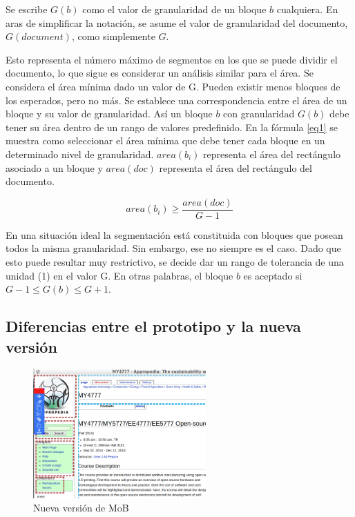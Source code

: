 \documentclass[10pt]{revecom}
\begin{document}
Se escribe $G(b)$ como el valor de granularidad de un bloque $b$ cualquiera.
En aras de simplificar la notación, se asume el valor de granularidad del documento, $G(document)$, como simplemente $G$.





Esto representa el número máximo de segmentos en los que se puede dividir el documento, lo que sigue es considerar un análisis similar para el área. 
Se considera el área mínima dado un valor de G. Pueden existir menos bloques de los esperados, pero no más. 
%
Se establece una correspondencia entre el área de un bloque y su valor de granularidad. Así un bloque $b$ con granularidad $G(b)$ debe tener su área dentro de un rango de valores predefinido.
%
En la fórmula \eqref{eq1} se muestra como seleccionar el área mínima que debe tener cada bloque en un determinado nivel de granularidad. $area(b_i)$ representa el área del rectángulo asociado a un bloque y $area(doc)$ representa el área del rectángulo del documento.

\begin{equation}
area(b_i) \geq\frac{area(doc)}{G-1} \label{eq1}
\end{equation}

En una situación ideal la segmentación está constituida con bloques que posean todos la misma granularidad. Sin embargo, ese no siempre es el caso. Dado que esto puede resultar muy restrictivo, se decide dar un rango de tolerancia de una unidad (1) en el valor G. En otras palabras, el bloque $b$ es aceptado si $G-1 \leq G(b) \leq G+1$. 

\subsection{Diferencias entre el prototipo y la nueva versión}

\begin{figure}[htbp]
\centerline{\includegraphics[width=250px]{new-mob.png}}
\caption{Nueva versi\'on de MoB}
\label{fig3}
\end{figure}
\end{document}

